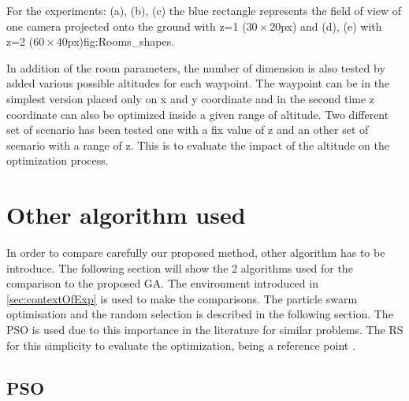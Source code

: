  
 \begin{mfigures}[!]{For the experiments: (a), (b), (c) the blue rectangle represents the field of view of one camera projected onto the ground  with z=1 ($30 \times 20 $px) and (d), (e) with z=2 ($60 \times 40 $px)}{fig:Rooms_shapes}. \centering
{}
\hspace{1cm}
\hspace{1cm}
\end{mfigures} 

 In addition of the room parameters, the number of dimension is also tested by  added various possible altitudes for each waypoint. The waypoint can be in the simplest version placed only on x and y coordinate and in the second time z coordinate can also be optimized inside a given range of altitude. 
 Two different set of scenario has been tested one with a fix value of z and  an other set of scenario with a range of z.  This is to evaluate the impact of the altitude on the optimization process.



\section{Other algorithm used}

In order to compare carefully our proposed method, other algorithm has to be introduce. The following section will show the 2 algorithms used for the comparison to the proposed GA. The environment introduced in \ref{sec:contextOfExp} is used to make the comparisons.  
The particle swarm optimisation and the random selection is described in the following section. The PSO is used due to this importance in the literature for similar problems. The RS for this simplicity to evaluate the optimization, being a reference point .  

\subsection{PSO }


